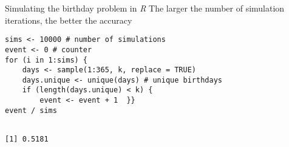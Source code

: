 \documentclass[presentation]{beamer}
\begin{document}
\begin{frame}[fragile,label={sec:org7c40f45}]{Simulating the birthday problem in \emph{R}}
 The larger the number of simulation iterations, the better the accuracy
\begin{verbatim}
sims <- 10000 # number of simulations
event <- 0 # counter
for (i in 1:sims) {
    days <- sample(1:365, k, replace = TRUE)
    days.unique <- unique(days) # unique birthdays
    if (length(days.unique) < k) {
        event <- event + 1  }}
event / sims
\end{verbatim}

\begin{verbatim}

[1] 0.5181
\end{verbatim}
\end{frame}
\end{document}
